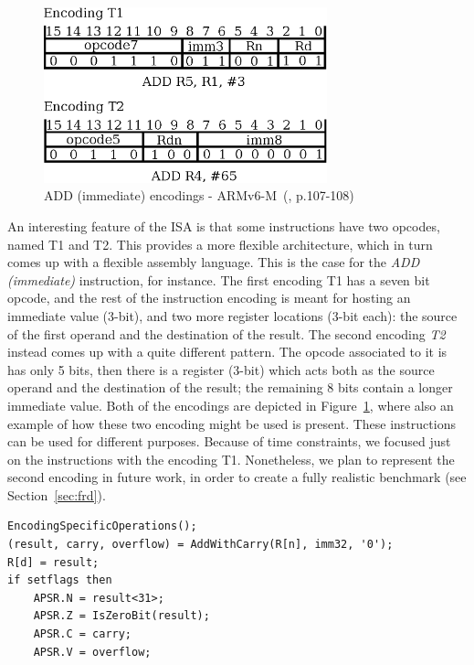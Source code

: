 \documentclass[conference]{IEEEtran}
\begin{document}
\begin{figure}[ht!]
\begin{center}
	\includegraphics[width=8.2cm]{IMG/encodings_ex.eps}
	\caption{ADD (immediate) encodings - ARMv6-M~(\cite{armManual}, p.107-108)}
	\label{fig:ADDEnc}
\end{center}
\end{figure}

An interesting feature of the ISA is that some instructions have two opcodes, named T1 and
T2. This provides a more flexible architecture, which in turn comes up with a
flexible assembly language. This is the case for the \textit{ADD (immediate)} instruction,
for instance. The first encoding T1 has a seven bit opcode, and the rest of the
instruction encoding is meant for hosting an immediate value (3-bit), and two more register
locations (3-bit each): the source of the first operand and the destination of the result.
The second encoding \textit{T2} instead comes up with a quite different pattern. The opcode
associated to it is has only 5 bits, then there is a register (3-bit) which acts both as the
source operand and the destination of the result; the remaining 8 bits contain a longer
immediate value. Both of the encodings are depicted in Figure~\ref{fig:ADDEnc},
where also an example of how these two encoding might be used is present. These
instructions can be used for different purposes. Because of time constraints, we focused just
on the instructions with the encoding T1. Nonetheless, we plan to represent the
second encoding in future work, in order to create a fully realistic benchmark (see 
Section~\ref{sec:frd}).\\

\begin{lstlisting}[caption=ADD (immediate) instruction - Reference specification,
frame=single, label=lis:add]
EncodingSpecificOperations();
(result, carry, overflow) = AddWithCarry(R[n], imm32, '0');
R[d] = result;
if setflags then
    APSR.N = result<31>;
    APSR.Z = IsZeroBit(result);
    APSR.C = carry;
    APSR.V = overflow;
\end{lstlisting}
\end{document}

